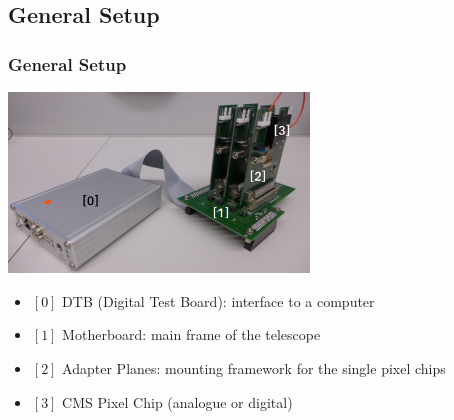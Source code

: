 \documentclass[9pt]{beamer}
\begin{document}
\subsection{General Setup}
\begin{frame}
	\frametitle{General Setup}
	\begin{center}
		\includegraphics[width=8cm]{Pics/setup}
	\end{center}
	\begin{itemize}
		\item $[0]$ DTB (Digital Test Board): interface to a computer
		\item $[1]$ Motherboard: main frame of the telescope
		\item $[2]$ Adapter Planes: mounting framework for the single pixel chips
		\item $[3]$ CMS Pixel Chip (analogue or digital)
	\end{itemize}
\end{frame}
\end{document}
